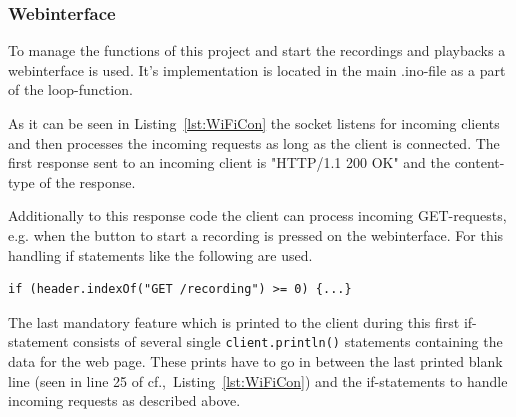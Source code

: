 \subsubsection{Webinterface}
To manage the functions of this project and start the recordings and playbacks a webinterface is used.
It's implementation is located in the main .ino-file as a part of the loop-function.

As it can be seen in Listing~\ref{lst:WiFiCon} the socket listens for incoming clients and then processes the incoming requests as long as the client is connected.
The first response sent to an incoming client is "HTTP/1.1 200 OK" and the content-type of the response.

Additionally to this response code the client can process incoming GET-requests, e.g. when the button to start a recording is pressed on the webinterface.
For this handling if statements like the following are used.
\begin{lstlisting}[style=inText] 
	if (header.indexOf("GET /recording") >= 0) {...}  
\end{lstlisting}
The last mandatory feature which is printed to the client during this first if-statement consists of several single \texttt{client.println()} statements containing the data for the web page.
These prints have to go in between the last printed blank line (seen in line 25 of cf.,~Listing~\ref{lst:WiFiCon}) and the if-statements to handle incoming requests as described above.

